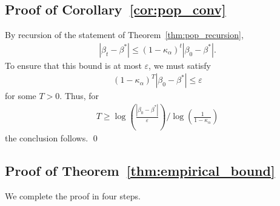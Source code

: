 \documentclass[runningheads]{llncs}
\begin{document}
\begin{subappendices}
\subsection*{Proof of Corollary~\ref{cor:pop_conv}}
By recursion of the statement of Theorem~\ref{thm:pop_recursion},
\begin{align*}
  |\beta_t-\beta^*|
  \leq (1-\kappa_\alpha)^t |\beta_0-\beta^*|.
\end{align*}
To ensure that this bound is at most $\varepsilon$,
we must satisfy
\begin{align*}
  (1-\kappa_\alpha)^T |\beta_0-\beta^*| \leq \varepsilon
\end{align*}
for some $T>0$.
Thus, for
\begin{align*}
  T \geq \log \left(
  \frac{|\beta_0-\beta^*|}{\varepsilon}\right) / \log \left(
  \frac{1}{1-\kappa_\alpha}\right)
\end{align*}
the conclusion follows.
\qed

\subsection*{Proof of Theorem~\ref{thm:empirical_bound}}
  We complete the proof in four steps.

\end{subappendices}
\end{document}
